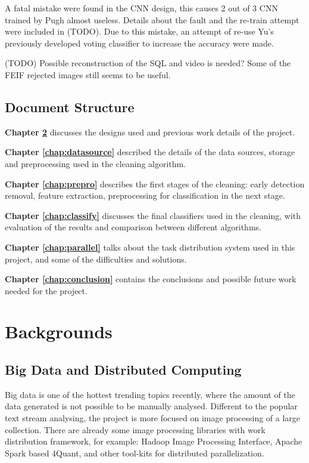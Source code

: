 \documentclass[bsc,logo,twoside,fullspacing,parskip]{infthesis}
\begin{document}
A fatal mistake were found in the CNN design, this causes 2 out of 3 CNN trained by Pugh almost useless. Details about the fault and the re-train attempt were included in (TODO).
Due to this mistake, an attempt of re-use Yu's previously developed voting classifier to increase the accuracy were made. 

(TODO) Possible reconstruction of the SQL and video is needed? Some of the FEIF rejected images still seems to be useful.

\section{Document Structure}

\textbf{Chapter \ref{chap:bg}} discusses the designs used and previous work details of the project. 

\textbf{Chapter \ref{chap:datasource}} described the details of the data sources, storage and preprocessing used in the cleaning algorithm.

\textbf{Chapter \ref{chap:prepro}} describes the first stages of the cleaning: early detection removal, feature extraction, preprocessing for classification in the next stage.

\textbf{Chapter \ref{chap:classify}} discusses the final classifiers used in the cleaning, with evaluation of the results and comparison between different algorithms. 


\textbf{Chapter \ref{chap:parallel}} talks about the task distribution system used in this project, and some of the difficulties and solutions.

\textbf{Chapter \ref{chap:conclusion}} contains the conclusions and possible future work needed for the project.
\newpage


\chapter{Backgrounds}
\label{chap:bg}

\section{Big Data and Distributed Computing}

Big data is one of the hottest trending topics recently, where the amount of the data generated is not possible to be manually analysed. 
Different to the popular text stream analysing, the project is more focused on image processing of a large collection. 
There are already some image processing libraries with work distribution framework, for example: Hadoop Image Processing Interface\cite{L3}, Apache Spark based 4Quant\cite{L4}, and other tool-kits for distributed parallelization.
\end{document}
